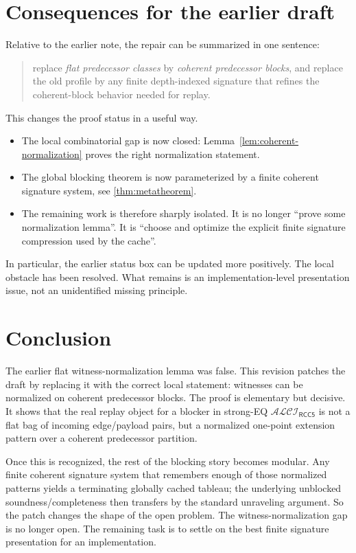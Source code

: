 \documentclass[11pt]{article}
\theoremstyle{definition}
\newcommand{\ALCIRCCFive}{\mathcal{ALCI}_{\mathsf{RCC5}}}
\begin{document}
\section{Consequences for the earlier draft}

Relative to the earlier note, the repair can be summarized in one sentence:
\begin{quote}
replace \emph{flat predecessor classes} by \emph{coherent predecessor blocks}, and replace the old profile by any finite depth-indexed signature that refines the coherent-block behavior needed for replay.
\end{quote}

This changes the proof status in a useful way.
\begin{itemize}
  \item The local combinatorial gap is now closed: Lemma~\ref{lem:coherent-normalization} proves the right normalization statement.
  \item The global blocking theorem is now parameterized by a finite coherent signature system, see \cref{thm:metatheorem}.
  \item The remaining work is therefore sharply isolated. It is no longer ``prove some normalization lemma''. It is ``choose and optimize the explicit finite signature compression used by the cache''.
\end{itemize}

In particular, the earlier status box can be updated more positively. The local obstacle has been resolved. What remains is an implementation-level presentation issue, not an unidentified missing principle.

\section{Conclusion}

The earlier flat witness-normalization lemma was false. This revision patches the draft by replacing it with the correct local statement: witnesses can be normalized on coherent predecessor blocks. The proof is elementary but decisive. It shows that the real replay object for a blocker in strong-EQ $\ALCIRCCFive$ is not a flat bag of incoming edge/payload pairs, but a normalized one-point extension pattern over a coherent predecessor partition.

Once this is recognized, the rest of the blocking story becomes modular. Any finite coherent signature system that remembers enough of those normalized patterns yields a terminating globally cached tableau; the underlying unblocked soundness/completeness then transfers by the standard unraveling argument. So the patch changes the shape of the open problem. The witness-normalization gap is no longer open. The remaining task is to settle on the best finite signature presentation for an implementation.
\end{document}
